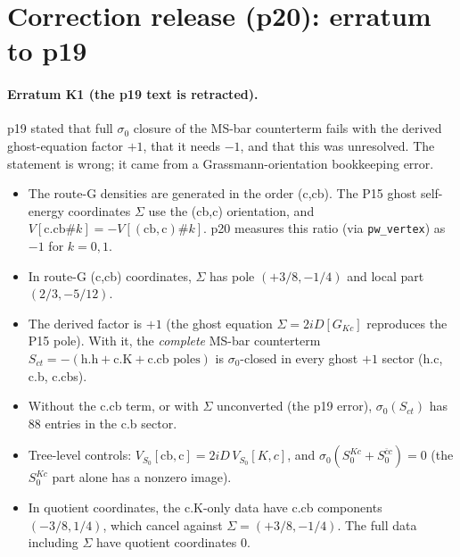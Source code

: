 \section{Correction release (p20): erratum to p19}

\paragraph{Erratum K1 (the p19 text is retracted).} p19 stated that full $\sigma_0$ closure of the MS-bar counterterm
fails with the derived ghost-equation factor $+1$, that it needs $-1$, and that this was unresolved. The statement is
wrong; it came from a Grassmann-orientation bookkeeping error.
\begin{itemize}
\item The route-G densities are generated in the order (c,cb). The P15 ghost self-energy coordinates $\Sigma$ use the
  (cb,c) orientation, and $V[\mathrm{c.cb}\#k]=-V[(\mathrm{cb,c})\#k]$. p20 measures this ratio (via
  \texttt{pw\_vertex}) as $-1$ for $k=0,1$.
\item In route-G (c,cb) coordinates, $\Sigma$ has pole $(+3/8,-1/4)$ and local part $(2/3,-5/12)$.
\item The derived factor is $+1$ (the ghost equation $\Sigma=2iD[G_{Kc}]$ reproduces the P15 pole). With it, the
  \emph{complete} MS-bar counterterm $S_{ct}=-(\text{h.h}+\text{c.K}+\text{c.cb poles})$ is $\sigma_0$-closed in
  every ghost $+1$ sector (h.c, c.b, c.cbs).
\item Without the c.cb term, or with $\Sigma$ unconverted (the p19 error), $\sigma_0(S_{ct})$ has 88 entries in the
  c.b sector.
\item Tree-level controls: $V_{S_0}[\mathrm{cb,c}]=2iD\,V_{S_0}[K,c]$, and $\sigma_0(S_0^{Kc}+S_0^{\bar cc})=0$ (the
  $S_0^{Kc}$ part alone has a nonzero image).
\item In quotient coordinates, the c.K-only data have c.cb components $(-3/8,1/4)$, which cancel against
  $\Sigma=(+3/8,-1/4)$. The full data including $\Sigma$ have quotient coordinates $0$.
\end{itemize}

